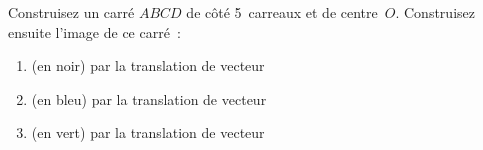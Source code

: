 \exercice Construisez un carré $ABCD$ de côté 5~carreaux et de centre~$O$. Construisez ensuite l'image de ce carré~:
\begin{enumerate}
	\item (en noir) par la translation de vecteur 
	\item (en bleu) par la translation de vecteur 
	\item (en vert) par la translation de vecteur 
\end{enumerate}